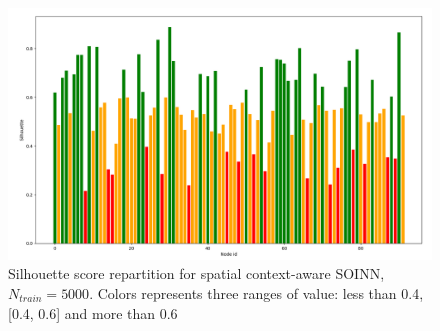 \begin{figure}[ht]
    \centering
    \includegraphics[width=130mm, keepaspectratio]{images/silhouette_refined.png}
    \caption[Silhouette score repartition for spatial context-aware SOINN]{Silhouette score repartition for spatial context-aware SOINN, $N_{train} = 5000$. Colors represents three ranges of value: less than 0.4, [0.4, 0.6] and more than 0.6}
    \label{fig:silhouette_after}
\end{figure}